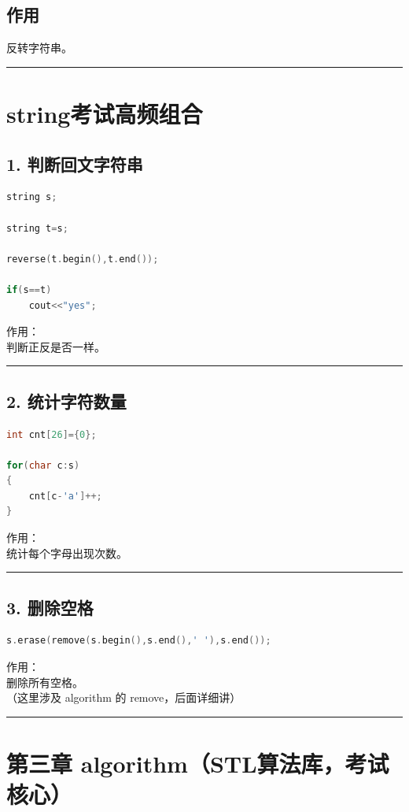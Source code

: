 \documentclass[9pt,twocolumn]{extarticle}
\begin{document}
\subsection{作用}
反转字符串。

\noindent\rule{\linewidth}{0.4pt}

\section{string考试高频组合}

\subsection{1. 判断回文字符串}
\begin{lstlisting}[language=C++]
string s;

string t=s;

reverse(t.begin(),t.end());

if(s==t)
    cout<<"yes";
\end{lstlisting}
作用：\\
判断正反是否一样。

\noindent\rule{\linewidth}{0.4pt}

\subsection{2. 统计字符数量}
\begin{lstlisting}[language=C++]
int cnt[26]={0};

for(char c:s)
{
    cnt[c-'a']++;
}
\end{lstlisting}
作用：\\
统计每个字母出现次数。

\noindent\rule{\linewidth}{0.4pt}

\subsection{3. 删除空格}
\begin{lstlisting}[language=C++]
s.erase(remove(s.begin(),s.end(),' '),s.end());
\end{lstlisting}
作用：\\
删除所有空格。\\
（这里涉及 algorithm 的 remove，后面详细讲）

\noindent\rule{\linewidth}{0.4pt}
\section{第三章 algorithm（STL算法库，考试核心）}
\end{document}

